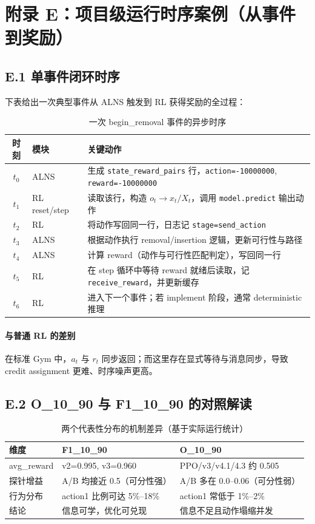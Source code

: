 ﻿\documentclass[11pt,a4paper]{ctexart}
\begin{document}
\section*{附录 E：项目级运行时序案例（从事件到奖励）}
\subsection*{E.1 单事件闭环时序}
下表给出一次典型事件从 ALNS 触发到 RL 获得奖励的全过程：
\begin{table}[H]
\centering
\caption{一次 begin\_removal 事件的异步时序}
\begin{tabular}{clp{8.7cm}}
\toprule
时刻 & 模块 & 关键动作 \\
\midrule
$t_0$ & ALNS & 生成 \texttt{state\_reward\_pairs} 行，\texttt{action=-10000000}, \texttt{reward=-10000000} \\
$t_1$ & RL reset/step & 读取该行，构造 $o_t\to x_t/X_t$，调用 \texttt{model.predict} 输出动作 \\
$t_2$ & RL & 将动作写回同一行，日志记 \texttt{stage=send\_action} \\
$t_3$ & ALNS & 根据动作执行 removal/insertion 逻辑，更新可行性与路径 \\
$t_4$ & ALNS & 计算 reward（动作与可行性匹配判定），写回同一行 \\
$t_5$ & RL & 在 step 循环中等待 reward 就绪后读取，记 \texttt{receive\_reward}，并更新缓存 \\
$t_6$ & RL & 进入下一个事件；若 implement 阶段，通常 deterministic 推理 \\
\bottomrule
\end{tabular}
\end{table}

\paragraph{与普通 RL 的差别}
在标准 Gym 中，$a_t$ 与 $r_t$ 同步返回；而这里存在显式等待与消息同步，导致 credit assignment 更难、时序噪声更高。

\subsection*{E.2 O\_10\_90 与 F1\_10\_90 的对照解读}
\begin{table}[H]
\centering
\caption{两个代表性分布的机制差异（基于实际运行统计）}
\begin{tabular}{p{3.2cm}p{5.2cm}p{5.2cm}}
\toprule
维度 & F1\_10\_90 & O\_10\_90 \\
\midrule
avg\_reward & v2=0.995, v3=0.960 & PPO/v3/v4.1/4.3 约 0.505 \\
探针增益 & A/B 均接近 0.5（可分性强） & A/B 多在 0.0--0.06（可分性弱） \\
行为分布 & action1 比例可达 5\%--18\% & action1 常低于 1\%--2\% \\
结论 & 信息可学，优化可兑现 & 信息不足且动作塌缩并发 \\
\bottomrule
\end{tabular}
\end{table}
\end{document}
